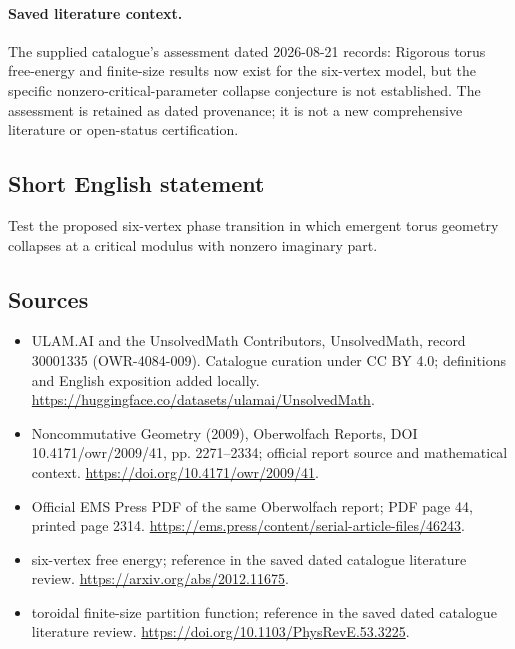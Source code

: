 \documentclass[11pt]{article}
\begin{document}
\paragraph{Saved literature context.} The supplied catalogue's assessment dated 2026-08-21 records: Rigorous torus free-energy and finite-size results now exist for the six-vertex model, but the specific nonzero-critical-parameter collapse conjecture is not established. The assessment is retained as dated provenance; it is not a new comprehensive literature or open-status certification.
\subsection{Short English statement}
Test the proposed six-vertex phase transition in which emergent torus geometry collapses at a critical modulus with nonzero imaginary part.
\subsection{Sources}
\begin{itemize}
\item[\hypertarget{source:30001335:1}{S1}] ULAM.AI and the UnsolvedMath Contributors, UnsolvedMath, record 30001335 (OWR-4084-009). Catalogue curation under CC BY 4.0; definitions and English exposition added locally.
\url{https://huggingface.co/datasets/ulamai/UnsolvedMath}.
\item[\hypertarget{source:30001335:2}{S2}] Noncommutative Geometry (2009), Oberwolfach Reports, DOI 10.4171/owr/2009/41, pp. 2271--2334; official report source and mathematical context.
\url{https://doi.org/10.4171/owr/2009/41}.
\item[\hypertarget{source:30001335:3}{S3}] Official EMS Press PDF of the same Oberwolfach report; PDF page 44, printed page 2314.
\url{https://ems.press/content/serial-article-files/46243}.
\item[\hypertarget{source:30001335:4}{S4}] six-vertex free energy; reference in the saved dated catalogue literature review.
\url{https://arxiv.org/abs/2012.11675}.
\item[\hypertarget{source:30001335:5}{S5}] toroidal finite-size partition function; reference in the saved dated catalogue literature review.
\url{https://doi.org/10.1103/PhysRevE.53.3225}.
\end{itemize}
\label{end:30001335}
\end{document}
